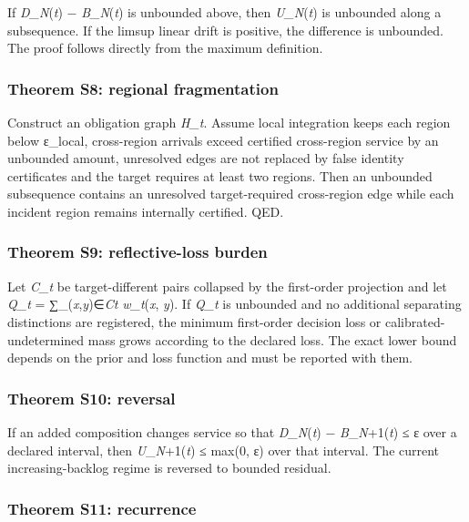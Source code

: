 If \emph{D\_N}(\emph{t}) − \emph{B\_N}(\emph{t}) is unbounded above,
then \emph{U\_N}(\emph{t}) is unbounded along a subsequence. If the
limsup linear drift is positive, the difference is unbounded. The proof
follows directly from the maximum definition.

\hypertarget{theorem-s8-regional-fragmentation}{%
\subsubsection{Theorem S8: regional
fragmentation}\label{theorem-s8-regional-fragmentation}}

Construct an obligation graph \emph{H\_t}. Assume local integration
keeps each region below ε\_local, cross-region arrivals exceed certified
cross-region service by an unbounded amount, unresolved edges are not
replaced by false identity certificates and the target requires at least
two regions. Then an unbounded subsequence contains an unresolved
target-required cross-region edge while each incident region remains
internally certified. QED.

\hypertarget{theorem-s9-reflective-loss-burden}{%
\subsubsection{Theorem S9: reflective-loss
burden}\label{theorem-s9-reflective-loss-burden}}

Let \emph{C\_t} be target-different pairs collapsed by the first-order
projection and let \emph{Q\_t} = ∑\_(\emph{x},\emph{y})∈\emph{Ct}
\emph{w\_t}(\emph{x}, \emph{y}). If \emph{Q\_t} is unbounded and no
additional separating distinctions are registered, the minimum
first-order decision loss or calibrated-undetermined mass grows
according to the declared loss. The exact lower bound depends on the
prior and loss function and must be reported with them.

\hypertarget{theorem-s10-reversal}{%
\subsubsection{Theorem S10: reversal}\label{theorem-s10-reversal}}

If an added composition changes service so that \emph{D\_N}(\emph{t}) −
\emph{B}\_\emph{N}+1(\emph{t}) ≤ ε over a declared interval, then
\emph{U}\_\emph{N}+1(\emph{t}) ≤ max(0, ε) over that interval. The
current increasing-backlog regime is reversed to bounded residual.

\hypertarget{theorem-s11-recurrence}{%
\subsubsection{Theorem S11: recurrence}\label{theorem-s11-recurrence}}

